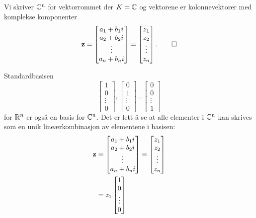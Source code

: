 \begin{defn}
Vi skriver $\mathbb{C}^n$ for vektorrommet der $K=\mathbb{C}$ og vektorene er kolonnevektorer med komplekse komponenter 
\[
\mathbf{z}=
\begin{bmatrix}
a_1+b_1 i    \\ a_2+b_2 i   \\ \vdots \\ a_n+b_n i 
\end{bmatrix}
=
\begin{bmatrix}
z_1    \\ z_2   \\ \vdots \\ z_n
\end{bmatrix}.\qedhere
\]
\end{defn}

\begin{ex}
Standardbasisen 
\[
\begin{bmatrix}
1    \\ 0  \\ \vdots \\ 0
\end{bmatrix},
\begin{bmatrix}
0    \\ 1  \\ \vdots \\ 0
\end{bmatrix}
...
\begin{bmatrix}
0    \\ 0  \\ \vdots \\ 1
\end{bmatrix}
\]
for $\mathbb{R}^n$ er også en basis for $\mathbb{C}^n$. 
Det er lett å se at alle elementer i $\mathbb{C}^n$ kan skrives som en unik lineærkombinasjon av elementene i basisen:
\begin{align*}
\mathbf{z}&=
\begin{bmatrix}
a_1+b_1 i    \\ a_2+b_2 i   \\ \vdots \\ a_n+b_n i 
\end{bmatrix}
=
\begin{bmatrix}
z_1    \\ z_2   \\ \vdots \\ z_n
\end{bmatrix}
\\&=
z_1
\begin{bmatrix}
1    \\ 0  \\ \vdots \\ 0

\end{bmatrix}
\end{align*}
\end{ex}
